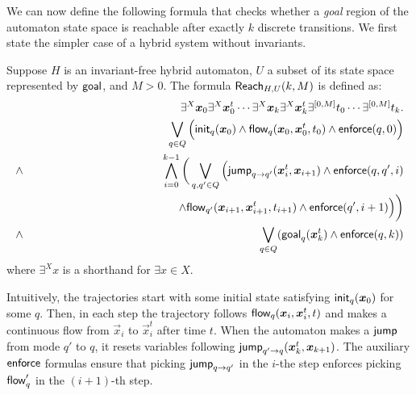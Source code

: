 We can now define the following formula that checks whether a {\em goal} region of the automaton
state space is reachable after exactly $k$ discrete transitions. We first state 
the simpler case of a hybrid system without invariants.
\begin{definition}
Suppose $H$ is an invariant-free hybrid automaton, $U$ a subset of its state space represented by $\mathsf{goal}$,
and $M>0$. The formula $\mathsf{Reach}_{H,U}(k,M)$ is defined as:
\begin{eqnarray*}
& &\exists^X \vec x_{0} \exists^X\vec x_{0}^t\cdots \exists^X \vec x_{k}\exists^X\vec x_{k}^t\exists^{[0,M]}t_0\cdots \exists^{[0,M]}t_k.\\
& &\bigvee_{q\in Q} \Big(\init_{q}(\vec x_{0})\wedge \flow_{q}(\vec x_{0}, \vec x_{0}^t, t_0)\wedge \enforce(q,0)\Big)\\%
\wedge & & \bigwedge_{i=0}^{k-1}\bigg( \bigvee_{q, q'\in Q} \Big(\jump_{q\rightarrow q'}(\vec x_{i}^t, \vec x_{i+1})\wedge \enforce(q,q',i)\\
& & \hspace{4.5cm}\wedge\flow_{q'}(\vec x_{i+1}, \vec x_{i+1}^t, t_{i+1})\wedge \enforce(q',i+1)\Big)\bigg)\\
\wedge & &\bigvee_{q\in Q} (\goal_q(\vec x_{k}^t)\wedge \enforce(q,k))
\end{eqnarray*}
where $\exists^X x$ is a shorthand for $\exists x\in X$.
\end{definition}
Intuitively, the trajectories start with some initial state satisfying $\init_q(\vec x_{0})$ for some $q$. 
Then, in each step the trajectory follows $\flow_q(\vec x_{i}, \vec x_{i}^t, t)$ and makes a continuous flow from $\vec x_i$ to $\vec x_i^t$ after time $t$. When the automaton makes a $\mathsf{jump}$ from mode $q'$ to $q$, it resets variables following $\jump_{q'\rightarrow q}(\vec x_{k}^t, \vec x_{k+1})$. The auxiliary $\mathsf{enforce}$ formulas ensure that picking $\mathsf{jump}_{q\rightarrow q'}$ in the $i$-the step enforces picking $\mathsf{flow}_q'$ in the $(i+1)$-th step.

